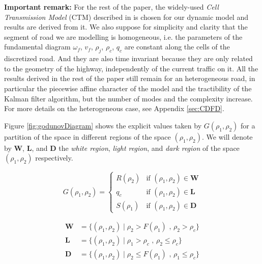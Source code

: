 \documentclass[11pt]{article}
\numberwithin{equation}{section}
\numberwithin{figure}{section}
\numberwithin{table}{section}
\begin{document}
\hspace{10mm}

\noindent\textbf{Important remark:} For the rest of the paper, the widely-used \textit{Cell Transmission Model} (CTM) described in \cite{Daganzo1994} is chosen for our dynamic model and results are derived from it. We also suppose for simplicity and clarity that the segment of road we are modelling is homogeneous, i.e. the parameters of the fundamental diagram $\omega_{f}$, $v_{f}$, $\rho_{j}$, $\rho_{c}$, $q_{c}$ are constant along the cells of the discretized road. And they are also time invariant because they are only related to the geometry of the highway, independently of the current traffic on it. All the results derived in the rest of the paper still remain for an heterogeneous road, in particular the piecewise affine character of the model and the tractibility of the Kalman filter algorithm, but the number of modes and the complexity increase. For more details on the heterogeneous case, see Appendix \ref{sec:CDFD}.

\hspace{10mm}

\noindent Figure \ref{fig:godunovDiagram} shows the explicit values taken by $G(\rho_{1},\rho_{2})$ for a partition of the space in different regions of the space $(\rho_{1},\rho_{2})$. We will denote by \textbf{W}, \textbf{L}, and \textbf{D} the \textit{white region}, \textit{light region}, and \textit{dark region} of the space $(\rho_{1},\rho_{2})$ respectively. 

\begin{equation}
G(\rho_{1},\rho_{2}) = \begin{cases}
R(\rho_{2}) & \text{if } (\rho_{1},\rho_{2}) \in \textbf{W}\\
q_{c} & \text{if } (\rho_{1},\rho_{2}) \in \textbf{L}\\
S(\rho_{1}) & \text{if } (\rho_{1},\rho_{2}) \in \textbf{D}
\end{cases}
\label{eq:rhoGodunovFlux}
\end{equation}

\begin{equation}
\begin{array}{ll}
\textbf{W} & = \{(\rho_{1},\rho_{2}) \mid \rho_{2} > F(\rho_{1}) \text{ ,   } \rho_{2} > \rho_{c}\}\\
\textbf{L} & = \{(\rho_{1},\rho_{2}) \mid \rho_{1} > \rho_{c} \text{ ,   } \rho_{2} \leq \rho_{c}\}\\
\textbf{D} & = \{(\rho_{1},\rho_{2}) \mid \rho_{2} \leq F(\rho_{1}) \text{ ,   } \rho_{1} \leq \rho_{c}\}
\end{array}
\label{eq:regions}
\end{equation}
\end{document}
